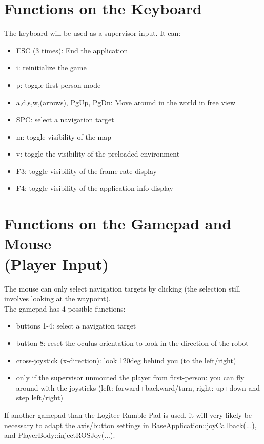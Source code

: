 \documentclass[a4paper, 12pt]{article}
\begin{document}
\section{Functions on the Keyboard}
The keyboard will be used as a supervisor input. It can:
\begin{itemize}
\item ESC (3 times): End the application
\item i: reinitialize the game
\item p: toggle first person mode
\item a,d,s,w,(arrows), PgUp, PgDn: Move around in the world in free view
\item SPC: select a navigation target
\item m: toggle visibility of the map
\item v: toggle the visibility of the preloaded environment
\item F3: toggle visibility of the frame rate display
\item F4: toggle visibility of the application info display
\end{itemize}

\section{Functions on the Gamepad and Mouse\\(Player Input)}
The mouse can only select navigation targets by clicking (the selection still involves looking at the waypoint).\\
The gamepad has 4 possible functions:
\begin{itemize}
\item buttons 1-4: select a navigation target
\item button 8: reset the oculus orientation to look in the direction of the robot
\item cross-joystick (x-direction): look 120deg behind you (to the left/right)
\item only if the supervisor unmouted the player from first-person: you can fly around with the joysticks (left: forward+backward/turn, right: up+down and step left/right)
\end{itemize}
If another gamepad than the Logitec Rumble Pad is used, it will very likely be necessary to adapt the axis/button settings in BaseApplication::joyCallback(...), and PlayerBody::injectROSJoy(...). 
\end{document}
